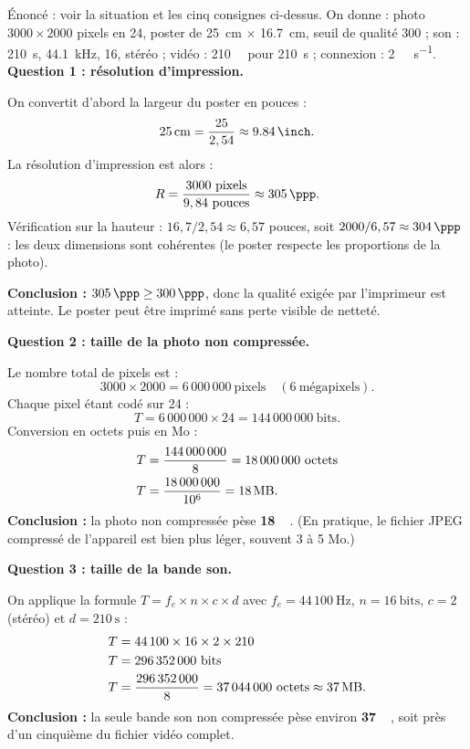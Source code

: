 \documentclass[11pt]{article}
\begin{document}
\begin{exoresolu}
Énoncé : voir la situation et les cinq consignes ci-dessus. On donne : photo $3000 \times 2000$ pixels en \SI{24}{\bit}, poster de \SI{25}{\centi\meter} $\times$ \SI{16,7}{\centi\meter}, seuil de qualité \SI{300}{\ppp} ; son : \SI{210}{\second}, \SI{44,1}{\kilo\hertz}, \SI{16}{\bit}, stéréo ; vidéo : \SI{210}{\mega\byte} pour \SI{210}{\second} ; connexion : \SI{2}{\mega\bit\per\second}.
\tcblower
\textbf{Question 1 : résolution d'impression.}

On convertit d'abord la largeur du poster en pouces :
\[
\SI{25}{\centi\meter} = \frac{25}{2,54} \approx \SI{9,84}{\inch}.
\]
La résolution d'impression est alors :
\[
R = \frac{3000\ \text{pixels}}{9,84\ \text{pouces}} \approx \SI{305}{\ppp}.
\]
Vérification sur la hauteur : $16,7 / 2,54 \approx 6,57$ pouces, soit $2000 / 6,57 \approx \SI{304}{\ppp}$ : les deux dimensions sont cohérentes (le poster respecte les proportions de la photo).

\textbf{Conclusion :} $\SI{305}{\ppp} \geq \SI{300}{\ppp}$, donc la qualité exigée par l'imprimeur est atteinte. Le poster peut être imprimé sans perte visible de netteté.

\textbf{Question 2 : taille de la photo non compressée.}

Le nombre total de pixels est :
\[
3000 \times 2000 = 6\,000\,000\ \text{pixels} \quad (6\ \text{mégapixels}).
\]
Chaque pixel étant codé sur \SI{24}{\bit} :
\[
T = 6\,000\,000 \times 24 = 144\,000\,000\ \mathrm{bits}.
\]
Conversion en octets puis en Mo :
\begin{align*}
T &= \frac{144\,000\,000}{8} = 18\,000\,000\ \mathrm{octets}\\
T &= \frac{18\,000\,000}{10^6} = \SI{18}{\mega\byte}.
\end{align*}
\textbf{Conclusion :} la photo non compressée pèse \textbf{\SI{18}{\mega\byte}}. (En pratique, le fichier JPEG compressé de l'appareil est bien plus léger, souvent 3 à 5 Mo.)

\textbf{Question 3 : taille de la bande son.}

On applique la formule $T = f_e \times n \times c \times d$ avec $f_e = 44\,100\ \mathrm{Hz}$, $n = 16\ \mathrm{bits}$, $c = 2$ (stéréo) et $d = 210\ \mathrm{s}$ :
\begin{align*}
T &= 44\,100 \times 16 \times 2 \times 210\\
T &= 296\,352\,000\ \mathrm{bits}\\
T &= \frac{296\,352\,000}{8} = 37\,044\,000\ \mathrm{octets} \approx \SI{37}{\mega\byte}.
\end{align*}
\textbf{Conclusion :} la seule bande son non compressée pèse environ \textbf{\SI{37}{\mega\byte}}, soit près d'un cinquième du fichier vidéo complet.


\end{exoresolu}
\end{document}

